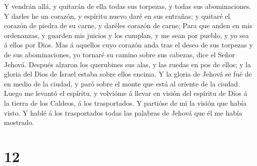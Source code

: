  Y vendrán allá, y quitarán de ella todas sus torpezas, y
todas sus abominaciones.  Y darles he un corazón, y
espíritu nuevo daré en sus entrañas; y quitaré el corazón de piedra de
su carne, y daréles corazón de carne;  Para que anden en
mis ordenanzas, y guarden mis juicios y los cumplan, y me sean por
pueblo, y yo sea á ellos por Dios.  Mas á aquellos cuyo
corazón anda tras el deseo de sus torpezas y de sus abominaciones, yo
tornaré su camino sobre sus cabezas, dice el Señor Jehová. 
Después alzaron los querubines sus alas, y las ruedas en pos de ellos; y
la gloria del Dios de Israel estaba sobre ellos encima.  Y
la gloria de Jehová se fué de en medio de la ciudad, y paró sobre el
monte que está al oriente de la ciudad.  Luego me levantó
el espíritu, y volvióme á llevar en visión del espíritu de Dios á la
tierra de los Caldeos, á los trasportados. Y partióse de mí la visión
que había visto.  Y hablé á los trasportados todas las
palabras de Jehová que él me había mostrado.

\hypertarget{section-11}{%
\section{12}\label{section-11}}

